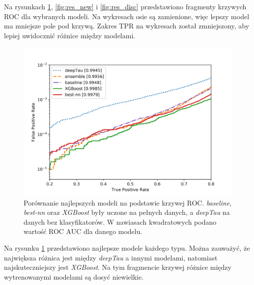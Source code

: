 \documentclass{pracalicmgr}
\begin{document}
	
	Na rysunkach \ref{fig:res_best}, \ref{fig:res_new} i \ref{fig:res_disc} przedstawiono fragmenty krzywych ROC dla wybranych modeli. Na wykresach osie są zamienione, więc lepszy model ma mniejsze pole pod krzywą. Zakres TPR na wykresach został zmniejszony, aby lepiej uwidocznić różnice między modelami.
	
	
	\begin{figure}[H]
	\centering
	\includegraphics[width=1\textwidth]{best_models.png}
	\caption{Porównanie najlepszych modeli na podstawie krzywej ROC.  \textit{baseline}, \textit{best-nn} oraz \textit{XGBoost} były uczone na pełnych danych, a \textit{deepTau} na danych bez klasyfikatorów. W nawiasach kwadratowych podano wartość ROC AUC dla danego modelu.}
	\label{fig:res_best}	
	\end{figure}
	
	Na rysunku \ref{fig:res_best} przedstawiono najlepsze modele każdego typu. Można zauważyć, że największa różnica jest między \textit{deepTau} a innymi modelami, natomiast najskuteczniejszy jest \textit{XGBoost}. Na tym fragmencie krzywej różnice między wytrenowanymi modelami są dosyć niewielkie.
	
\end{document}
